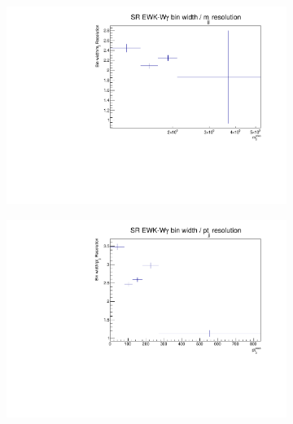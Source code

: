 \begin{figure}[t]
\centering
\begin{subfigure}[b]{0.48\textwidth}
    \centering
    \includegraphics[width=\textwidth]{plots/diffx/binning/jj_m_resolutions_rebin_SR.pdf}
    \caption{}
\end{subfigure}
\hfill
\begin{subfigure}[b]{0.48\textwidth}
    \centering
    \includegraphics[width=\textwidth]{plots/diffx/binning/jj_pt_resolutions_rebin_SR.pdf}
    \caption{}
\end{subfigure}
\begin{subfigure}[b]{0.48\textwidth}
    \centering

\end{subfigure}
\end{figure}
